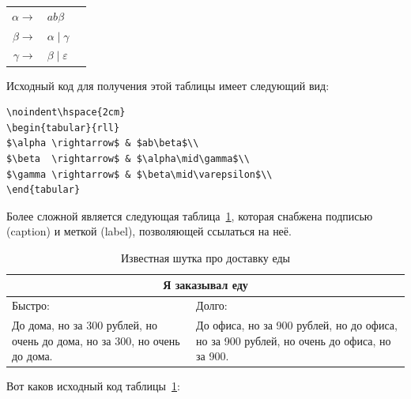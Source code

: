 \medskip
\noindent\hspace{2cm}
\begin{tabular}{rll}
$\alpha \rightarrow$ & $ab\beta$\\
$\beta  \rightarrow$ & $\alpha\mid\gamma$\\
$\gamma \rightarrow$ & $\beta\mid\varepsilon$\\
\end{tabular}
\medskip

\noindent Исходный код для получения этой таблицы имеет следующий вид:

\begin{small}
\begin{verbatim}
\noindent\hspace{2cm}
\begin{tabular}{rll}
$\alpha \rightarrow$ & $ab\beta$\\
$\beta  \rightarrow$ & $\alpha\mid\gamma$\\
$\gamma \rightarrow$ & $\beta\mid\varepsilon$\\
\end{tabular}
\end{verbatim}
\end{small}

Более сложной является следующая таблица~\ref{tabl:crayfish},
которая снабжена
подписью (caption) и меткой (label), позволяющей ссылаться на неё.

\begin{table}[ht!]
\caption{Известная шутка про доставку еды}\label{tabl:crayfish}
\begin{center}
\begin{tabular}{|p{5cm}|p{5cm}|}
\hline
\multicolumn{2}{|c|}{\large\textbf{Я заказывал еду}}\\
\hline
Быстро: & Долго: \\
\hline
До дома, но за 300 рублей, но очень
до дома, но за 300, но очень до дома.
&
До офиса, но за 900 рублей, но до офиса, но
за 900 рублей, но очень до офиса,
но за 900.\\
\hline
\end{tabular}
\end{center}
\end{table}

\noindent 
Вот каков исходный код таблицы~\ref{tabl:crayfish}:


